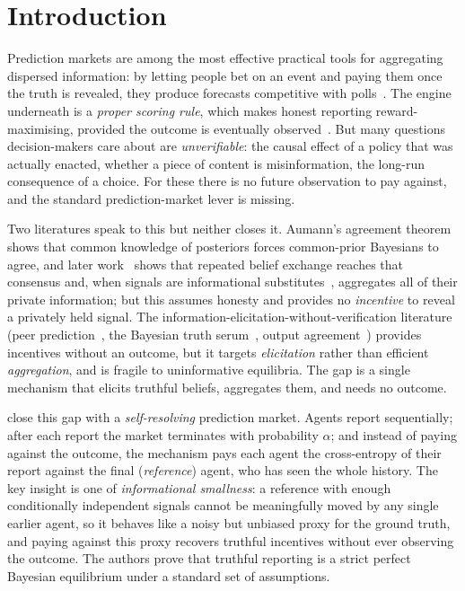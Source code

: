 \section{Introduction}
\label{sec:introduction}

Prediction markets are among the most effective practical tools for aggregating
dispersed information: by letting people bet on an event and paying them once the truth
is revealed, they produce forecasts competitive with
polls~\parencite{berg2008results}. The engine underneath is a \emph{proper scoring
rule}, which makes honest reporting reward-maximising, provided the outcome is
eventually observed~\parencite{brier1950verification,good1952rational,gneiting2007strictly}.
But many questions decision-makers care about are \emph{unverifiable}: the causal effect
of a policy that was actually enacted, whether a piece of content is misinformation, the
long-run consequence of a choice. For these there is no future observation to pay
against, and the standard prediction-market lever is missing.

Two literatures speak to this but neither closes it. Aumann's agreement
theorem~\parencite{aumann1976agreeing} shows that common knowledge of posteriors forces
common-prior Bayesians to agree, and later work~\parencite{kong2022aggregation} shows that
repeated belief exchange reaches that consensus and, when signals are informational
substitutes~\parencite{chen2016informational}, aggregates all of their private information;
but this assumes honesty and provides no
\emph{incentive} to reveal a privately held signal. The information-elicitation-without-verification
literature (peer prediction~\parencite{miller2005eliciting}, the Bayesian truth
serum~\parencite{prelec2004bayesian}, output agreement~\parencite{waggoner2014output})
provides incentives without an outcome, but it targets \emph{elicitation} rather than
efficient \emph{aggregation}, and is fragile to uninformative
equilibria. The gap is a single mechanism that elicits truthful beliefs, aggregates
them, and needs no outcome.

\textcite{srinivasan2025selfresolving} close this gap with a \emph{self-resolving}
prediction market. Agents report sequentially; after each report the market terminates
with probability $\alpha$; and instead of paying against the outcome, the mechanism pays
each agent the cross-entropy of their report against the final (\emph{reference}) agent,
who has seen the whole history. The key insight is one of \emph{informational smallness}:
a reference with enough conditionally independent signals cannot be meaningfully moved by
any single earlier agent, so it behaves like a noisy but unbiased proxy for the ground
truth, and paying against this proxy recovers truthful incentives without ever
observing the outcome. The authors prove that truthful reporting is a strict perfect
Bayesian equilibrium under a standard set of assumptions.

